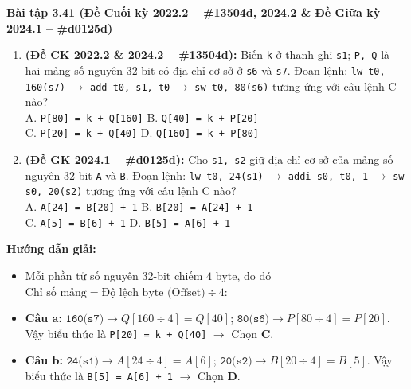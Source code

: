 \textbf{Bài tập 3.41 (Đề Cuối kỳ 2022.2 -- \#13504d, 2024.2 \& Đề Giữa kỳ 2024.1 -- \#d0125d)}
\begin{enumerate}[label=\alph*)]
    \item \textbf{(Đề CK 2022.2 \& 2024.2 -- \#13504d):} Biến \texttt{k} ở thanh ghi \texttt{s1}; \texttt{P, Q} là hai mảng số nguyên 32-bit có địa chỉ cơ sở ở \texttt{s6} và \texttt{s7}. Đoạn lệnh: \texttt{lw t0, 160(s7)} $\rightarrow$ \texttt{add t0, s1, t0} $\rightarrow$ \texttt{sw t0, 80(s6)} tương ứng với câu lệnh C nào?\\
    A. \texttt{P[80] = k + Q[160]} \qquad B. \texttt{Q[40] = k + P[20]}\\
    C. \texttt{P[20] = k + Q[40]} \qquad D. \texttt{Q[160] = k + P[80]}
    \item \textbf{(Đề GK 2024.1 -- \#d0125d):} Cho \texttt{s1, s2} giữ địa chỉ cơ sở của mảng số nguyên 32-bit \texttt{A} và \texttt{B}. Đoạn lệnh: \texttt{lw t0, 24(s1)} $\rightarrow$ \texttt{addi s0, t0, 1} $\rightarrow$ \texttt{sw s0, 20(s2)} tương ứng với câu lệnh C nào?\\
    A. \texttt{A[24] = B[20] + 1} \qquad B. \texttt{B[20] = A[24] + 1}\\
    C. \texttt{A[5] = B[6] + 1} \qquad D. \texttt{B[5] = A[6] + 1}
\end{enumerate}
\textbf{Hướng dẫn giải:}
\begin{itemize}
    \item Mỗi phần tử số nguyên 32-bit chiếm $4\text{ byte}$, do đó $\text{Chỉ số mảng} = \text{Độ lệch byte (Offset)} \div 4$:
    \item \textbf{Câu a:} $\texttt{160(s7)} \rightarrow Q[160 \div 4] = Q[40]$; $\texttt{80(s6)} \rightarrow P[80 \div 4] = P[20]$. Vậy biểu thức là \texttt{P[20] = k + Q[40]} $\rightarrow$ Chọn \textbf{C}.
    \item \textbf{Câu b:} $\texttt{24(s1)} \rightarrow A[24 \div 4] = A[6]$; $\texttt{20(s2)} \rightarrow B[20 \div 4] = B[5]$. Vậy biểu thức là \texttt{B[5] = A[6] + 1} $\rightarrow$ Chọn \textbf{D}.
\end{itemize}

